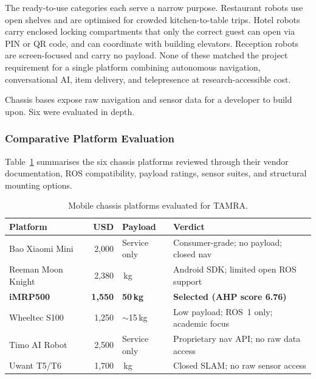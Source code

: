 \noindent The ready-to-use categories each serve a narrow purpose. Restaurant robots use open shelves and are optimised for crowded kitchen-to-table trips. Hotel robots carry enclosed locking compartments that only the correct guest can open via PIN or QR code, and can coordinate with building elevators. Reception robots are screen-focused and carry no payload. None of these matched the project requirement for a single platform combining autonomous navigation, conversational AI, item delivery, and telepresence at research-accessible cost.

Chassis bases expose raw navigation and sensor data for a developer to build upon. Six were evaluated in depth.

\subsubsection{Comparative Platform Evaluation}

Table~\ref{tab:platform_eval} summarises the six chassis platforms reviewed through their vendor documentation, ROS compatibility, payload ratings, sensor suites, and structural mounting options.

\begin{table}[H]
\centering
\small
\caption{Mobile chassis platforms evaluated for TAMRA.}
\label{tab:platform_eval}
\setlength{\tabcolsep}{4pt}
\begin{tabular}{@{} >{\raggedright\arraybackslash}p{2.8cm} r >{\raggedright\arraybackslash}p{1.5cm} >{\raggedright\arraybackslash}p{3.4cm} @{}}
\toprule
\textbf{Platform} & \textbf{USD} & \textbf{Payload} & \textbf{Verdict} \\
\midrule
Bao Xiaomi Mini    & 2{,}000 & Service only & Consumer-grade; no payload; closed nav \\
Reeman Moon Knight & 2{,}380 & 60\,kg       & Android SDK; limited open ROS support \\
\textbf{iMRP500}   & \textbf{1{,}550} & \textbf{50\,kg} & \textbf{Selected (AHP score 6.76)} \\
Wheeltec S100      & 1{,}250 & $\sim$15\,kg & Low payload; ROS~1 only; academic focus \\
Timo AI Robot      & 2{,}500 & Service only & Proprietary nav API; no raw data access \\
Uwant T5/T6        & 1{,}700 & 40\,kg       & Closed SLAM; no raw sensor access \\
\bottomrule
\end{tabular}
\end{table}

